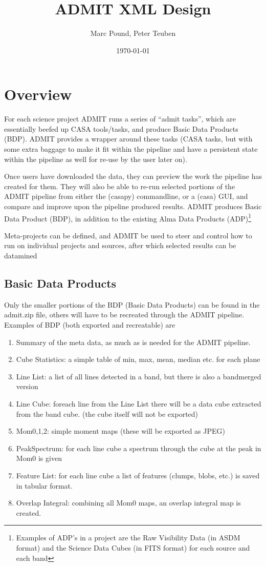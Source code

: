 \documentclass{report}
\title{ADMIT XML Design}
\author{Marc Pound, Peter Teuben}
\date{\today}
\begin{document}
\maketitle

\section{Overview}

For each science project ADMIT runs a series of ``admit tasks'', which
are essentially beefed up CASA tools/tasks, and produce Basic Data
Products (BDP).  ADMIT provides a wrapper around these tasks
(CASA tasks, but with some extra baggage to make it fit within the pipeline
and have a persistent state within the pipeline as well for re-use by
the user later on).

Once users have downloaded the data, they can preview the work the pipeline
has created for them. They will also be able to re-run
selected portions of the ADMIT pipeline from either the (casapy)
commandline, or a (casa) GUI, and compare and improve upon the
pipeline produced results. ADMIT produces Basic Data Product (BDP), in
addition to the existing Alma Data Products (ADP)\footnote{Examples of
ADP's in a project are the Raw Visibility Data (in ASDM format) and
the Science Data Cubes (in FITS format) for each source and each
band}

Meta-projects can be defined, and ADMIT be used to steer and control
how to run on individual projects and sources, after which selected
results can be datamined 

\subsection{Basic Data Products}

Only the smaller portions of the BDP (Basic Data Products) can be found
in the admit.zip file, others will have to be recreated through the
ADMIT pipeline. Examples of BDP (both exported and recreatable) are

\begin{enumerate}
\item
Summary of the meta data, as much as is needed for the ADMIT pipeline.
\item
Cube Statistics: a simple table of min, max, mean, median etc. for each plane
\item
Line List: a list of all lines detected in a band, but there is also a bandmerged version
\item
Line Cube: foreach line from the Line List there will be a data cube extracted from the
band cube.  (the cube itself will not be exported)
\item
Mom0,1,2: simple moment maps  (these will be exported as JPEG)
\item
PeakSpectrum: for each line cube a spectrum through the cube at the peak in Mom0 is given
\item
Feature List: for each line cube a list of features (clumps, blobs, etc.) is saved in tabular format.
\item 
Overlap Integral: combining all Mom0 maps, an overlap integral map is created.

\end{enumerate}
\end{document}
